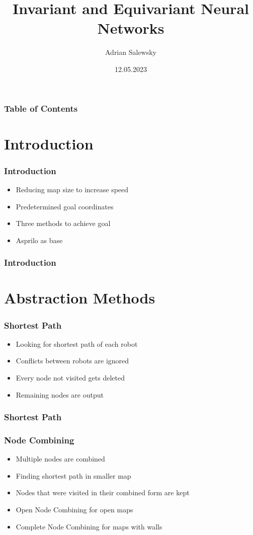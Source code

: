\documentclass{beamer}
\title{Invariant and Equivariant Neural Networks}
\author[Adrian Salewsky]{Adrian Salewsky}
\institute{Technische Universität Berlin}
\date{12.05.2023}
\begin{document}
\frame{\titlepage}

\begin{frame}
\frametitle{Table of Contents}
\tableofcontents
\end{frame}

\section{Introduction} 
\begin{frame}
\frametitle{Introduction}
\begin{itemize}
\item<2-> Reducing map size to increase speed
\medskip
\item<3-> Predetermined goal coordinates
\medskip
\item<4-> Three methods to achieve goal
\medskip
\item<5-> Asprilo as base
\end{itemize}
\end{frame}

\begin{frame}
\frametitle{Introduction}
\begin{figure}[h]
\end{figure}
\end{frame}

\section{Abstraction Methods}
\begin{frame}
\frametitle{Shortest Path}
\begin{itemize}
\item<2-> Looking for shortest path of each robot
\medskip
\item<3-> Conflicts between robots are ignored
\medskip
\item<4-> Every node not visited gets deleted
\medskip
\item<5-> Remaining nodes are output
\end{itemize}
\end{frame}

\begin{frame}
\frametitle{Shortest Path}
\begin{figure}[h]
\end{figure}
\end{frame}

\begin{frame}
\frametitle{Node Combining}
\begin{itemize}
\item<2-> Multiple nodes are combined
\medskip
\item<3-> Finding shortest path in smaller map
\medskip
\item<4-> Nodes that were visited in their combined form are kept
\medskip
\item<5-> Open Node Combining for open maps
\item<6-> Complete Node Combining for maps with walls
\end{itemize}
\end{frame}
\end{document}

